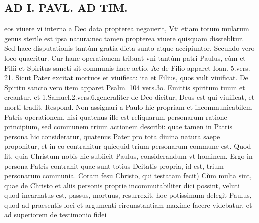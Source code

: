 \documentclass{article}
\begin{document}
\begin{pages}
\section*{AD I. PAVL. AD TIM. }
\marginpar{[ p.RIE. ]}\pstart eos viuere vi interna a Deo data propterea negauerit, Vti etiam totum mularum genus sterile est ipsa natura:nec tamen propterea viuere quisquam disstebltur. Sed haec disputationis tantùm gratia dicta sunto atque accipiuntor.  \pend\pstart Secundo vero loco quaeritur. Cur hanc operationem tribuat vni tantùm patri Paulus, cùm et Filii et Spiritus sancti sit communis haec actio. Ac de Filio apparet Ioan. 5.vers. 21. Sicut Pater excitat mortuos et viuifieat: ita et Filius, quos vult viuificat. De Spiritu sancto vero item apparet Psalm. 104 vers.3o. Emittis spiritum tuum et creantur, et 1.Samuel.2.vers.6.generaliter de Deo dicitur, Deus est qui viuificat, et morti tradit. Respond. Non assignari a Paulo hic propriam et incommunicabilem Patris operationem, nisi quatenus ille est reliquarum personarum ratione principium, sed communem trium actionem describi: quae tamen in Patris persona hic consideratur, quatenus Pater pro tota diuina natura saepe proponitur, et in eo contrahitur quicquid trium personarum commune est. Quod fit, quia Christum nobis hic subiicit Paulus, considerandum vt hominem. Ergo in persona Patris contrahit quae sunt totius Deitatis propria, id est, trium personarum communia. Coram fesu Christo, qui testatam fecit) Cùm multa sint, quae de Christo et aliis personis proprie incommutabiliter dici possint, veluti quod incarnatus est, passus, mortuus, resurrexit, hoc potissimum delegit Paulus, quod ad praesentis loci et argumenti circunstantiam maxime facere videbatur, et ad superiorem de testimonio fidei  \pend

\end{pages}
\end{document}
